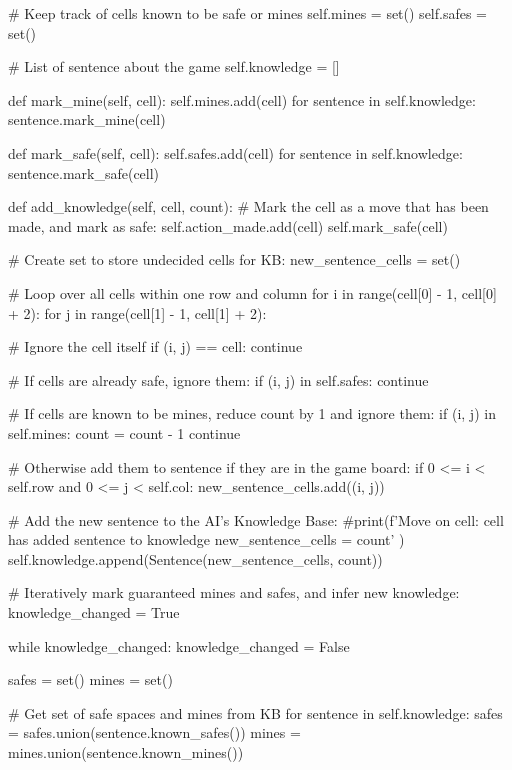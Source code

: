 \documentclass{article} %
\begin{document}
\begin{code}
        # Keep track of cells known to be safe or mines
        self.mines = set()
        self.safes = set()

        # List of sentence about the game
        self.knowledge = []

    def mark_mine(self, cell):
        self.mines.add(cell)
        for sentence in self.knowledge:
            sentence.mark_mine(cell)

    def mark_safe(self, cell):
        self.safes.add(cell)
        for sentence in self.knowledge:
            sentence.mark_safe(cell)

    def add_knowledge(self, cell, count):
        # Mark the cell as a move that has been made, and mark as safe:
        self.action_made.add(cell)
        self.mark_safe(cell)

        # Create set to store undecided cells for KB:
        new_sentence_cells = set()

        # Loop over all cells within one row and column
        for i in range(cell[0] - 1, cell[0] + 2):
            for j in range(cell[1] - 1, cell[1] + 2):

                # Ignore the cell itself
                if (i, j) == cell:
                    continue

                # If cells are already safe, ignore them:
                if (i, j) in self.safes:
                    continue

                # If cells are known to be mines, reduce count by 1 and ignore them:
                if (i, j) in self.mines:
                    count = count - 1
                    continue

                # Otherwise add them to sentence if they are in the game board:
                if 0 <= i < self.row and 0 <= j < self.col:
                    new_sentence_cells.add((i, j))

        # Add the new sentence to the AI's Knowledge Base:
        #print(f'Move on cell: {cell} has added sentence to knowledge {new_sentence_cells} = {count}' )
        self.knowledge.append(Sentence(new_sentence_cells, count))

        # Iteratively mark guaranteed mines and safes, and infer new knowledge:
        knowledge_changed = True

        while knowledge_changed:
            knowledge_changed = False

            safes = set()
            mines = set()

            # Get set of safe spaces and mines from KB
            for sentence in self.knowledge:
                safes = safes.union(sentence.known_safes())
                mines = mines.union(sentence.known_mines())


\end{code}
\end{document}
